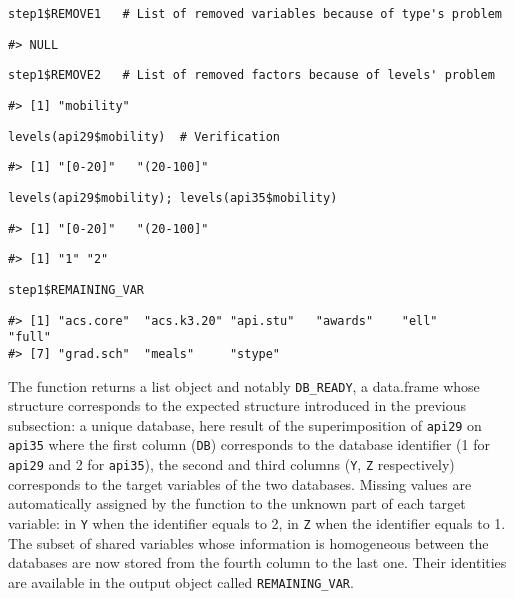 \begin{verbatim}
step1$REMOVE1   # List of removed variables because of type's problem
\end{verbatim}

\begin{verbatim}
#> NULL
\end{verbatim}

\begin{verbatim}
step1$REMOVE2   # List of removed factors because of levels' problem
\end{verbatim}

\begin{verbatim}
#> [1] "mobility"
\end{verbatim}

\begin{verbatim}
levels(api29$mobility)  # Verification
\end{verbatim}

\begin{verbatim}
#> [1] "[0-20]"   "(20-100]"
\end{verbatim}

\begin{verbatim}
levels(api29$mobility); levels(api35$mobility)
\end{verbatim}

\begin{verbatim}
#> [1] "[0-20]"   "(20-100]"
\end{verbatim}

\begin{verbatim}
#> [1] "1" "2"
\end{verbatim}

\begin{verbatim}
step1$REMAINING_VAR
\end{verbatim}

\begin{verbatim}
#> [1] "acs.core"  "acs.k3.20" "api.stu"   "awards"    "ell"       "full"     
#> [7] "grad.sch"  "meals"     "stype"
\end{verbatim}

The function returns a list object and notably \texttt{DB\_READY}, a data.frame whose structure corresponds to the expected structure introduced in the previous subsection: a unique database, here result of the superimposition of \texttt{api29} on \texttt{api35} where the first column (\texttt{DB}) corresponds to the database identifier (1 for \texttt{api29} and 2 for \texttt{api35}), the second and third columns (\texttt{Y}, \texttt{Z} respectively) corresponds to the target variables of the two databases. Missing values are automatically assigned by the function to the unknown part of each target variable: in \texttt{Y} when the identifier equals to 2, in \texttt{Z} when the identifier equals to 1. The subset of shared variables whose information is homogeneous between the databases are now stored from the fourth column to the last one. Their identities are available in the output object called \texttt{REMAINING\_VAR}.

